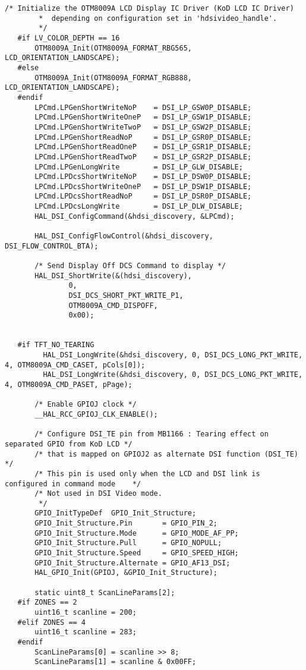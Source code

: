 \begin{lstlisting}[captionpos=t, caption={Fichero \texttt{tft.c}}]
       /* Initialize the OTM8009A LCD Display IC Driver (KoD LCD IC Driver)
        *  depending on configuration set in 'hdsivideo_handle'.
        */
   #if LV_COLOR_DEPTH == 16
       OTM8009A_Init(OTM8009A_FORMAT_RBG565, LCD_ORIENTATION_LANDSCAPE);
   #else
       OTM8009A_Init(OTM8009A_FORMAT_RGB888, LCD_ORIENTATION_LANDSCAPE);
   #endif
       LPCmd.LPGenShortWriteNoP    = DSI_LP_GSW0P_DISABLE;
       LPCmd.LPGenShortWriteOneP   = DSI_LP_GSW1P_DISABLE;
       LPCmd.LPGenShortWriteTwoP   = DSI_LP_GSW2P_DISABLE;
       LPCmd.LPGenShortReadNoP     = DSI_LP_GSR0P_DISABLE;
       LPCmd.LPGenShortReadOneP    = DSI_LP_GSR1P_DISABLE;
       LPCmd.LPGenShortReadTwoP    = DSI_LP_GSR2P_DISABLE;
       LPCmd.LPGenLongWrite        = DSI_LP_GLW_DISABLE;
       LPCmd.LPDcsShortWriteNoP    = DSI_LP_DSW0P_DISABLE;
       LPCmd.LPDcsShortWriteOneP   = DSI_LP_DSW1P_DISABLE;
       LPCmd.LPDcsShortReadNoP     = DSI_LP_DSR0P_DISABLE;
       LPCmd.LPDcsLongWrite        = DSI_LP_DLW_DISABLE;
       HAL_DSI_ConfigCommand(&hdsi_discovery, &LPCmd);
   
       HAL_DSI_ConfigFlowControl(&hdsi_discovery, DSI_FLOW_CONTROL_BTA);
   
       /* Send Display Off DCS Command to display */
       HAL_DSI_ShortWrite(&(hdsi_discovery),
               0,
               DSI_DCS_SHORT_PKT_WRITE_P1,
               OTM8009A_CMD_DISPOFF,
               0x00);
   
   
   #if TFT_NO_TEARING
         HAL_DSI_LongWrite(&hdsi_discovery, 0, DSI_DCS_LONG_PKT_WRITE, 4, OTM8009A_CMD_CASET, pCols[0]);
         HAL_DSI_LongWrite(&hdsi_discovery, 0, DSI_DCS_LONG_PKT_WRITE, 4, OTM8009A_CMD_PASET, pPage);
   
       /* Enable GPIOJ clock */
       __HAL_RCC_GPIOJ_CLK_ENABLE();
   
       /* Configure DSI_TE pin from MB1166 : Tearing effect on separated GPIO from KoD LCD */
       /* that is mapped on GPIOJ2 as alternate DSI function (DSI_TE)                      */
       /* This pin is used only when the LCD and DSI link is configured in command mode    */
       /* Not used in DSI Video mode.
        */
       GPIO_InitTypeDef  GPIO_Init_Structure;
       GPIO_Init_Structure.Pin       = GPIO_PIN_2;
       GPIO_Init_Structure.Mode      = GPIO_MODE_AF_PP;
       GPIO_Init_Structure.Pull      = GPIO_NOPULL;
       GPIO_Init_Structure.Speed     = GPIO_SPEED_HIGH;
       GPIO_Init_Structure.Alternate = GPIO_AF13_DSI;
       HAL_GPIO_Init(GPIOJ, &GPIO_Init_Structure);
   
       static uint8_t ScanLineParams[2];
   #if ZONES == 2
       uint16_t scanline = 200;
   #elif ZONES == 4
       uint16_t scanline = 283;
   #endif
       ScanLineParams[0] = scanline >> 8;
       ScanLineParams[1] = scanline & 0x00FF;
   

\end{lstlisting}
